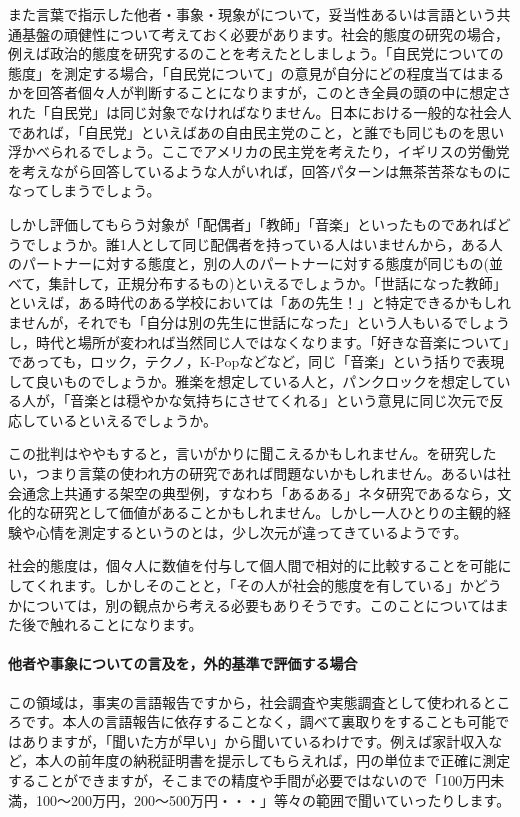 \documentclass{ltjsbook}
\begin{document}
また言葉で指示した他者・事象・現象がについて，妥当性あるいは言語という共通基盤の頑健性について考えておく必要があります。社会的態度の研究の場合，例えば政治的態度を研究するのことを考えたとしましょう。「自民党についての態度」を測定する場合，「自民党について」の意見が自分にどの程度当てはまるかを回答者個々人が判断することになりますが，このとき全員の頭の中に想定された「自民党」は同じ対象でなければなりません。日本における一般的な社会人であれば，「自民党」といえばあの自由民主党のこと，と誰でも同じものを思い浮かべられるでしょう。ここでアメリカの民主党を考えたり，イギリスの労働党を考えながら回答しているような人がいれば，回答パターンは無茶苦茶なものになってしまうでしょう。

しかし評価してもらう対象が「配偶者」「教師」「音楽」といったものであればどうでしょうか。誰1人として同じ配偶者を持っている人はいませんから，ある人のパートナーに対する態度と，別の人のパートナーに対する態度が同じもの(並べて，集計して，正規分布するもの)といえるでしょうか。「世話になった教師」といえば，ある時代のある学校においては「あの先生！」と特定できるかもしれませんが，それでも「自分は別の先生に世話になった」という人もいるでしょうし，時代と場所が変われば当然同じ人ではなくなります。「好きな音楽について」であっても，ロック，テクノ，K-Popなどなど，同じ「音楽」という括りで表現して良いものでしょうか。雅楽を想定している人と，パンクロックを想定している人が，「音楽とは穏やかな気持ちにさせてくれる」という意見に同じ次元で反応しているといえるでしょうか。

この批判はややもすると，言いがかりに聞こえるかもしれません。を研究したい，つまり言葉の使われ方の研究であれば問題ないかもしれません。あるいは社会通念上共通する架空の典型例，すなわち「あるある」ネタ研究であるなら，文化的な研究として価値があることかもしれません。しかし一人ひとりの主観的経験や心情を測定するというのとは，少し次元が違ってきているようです。

社会的態度は，個々人に数値を付与して個人間で相対的に比較することを可能にしてくれます。しかしそのことと，「その人が社会的態度を有している」かどうかについては，別の観点から考える必要もありそうです。このことについてはまた後で触れることになります。

\paragraph{他者や事象についての言及を，外的基準で評価する場合}
この領域は，事実の言語報告ですから，社会調査や実態調査として使われるところです。本人の言語報告に依存することなく，調べて裏取りをすることも可能ではありますが，「聞いた方が早い」から聞いているわけです。例えば家計収入など，本人の前年度の納税証明書を提示してもらえれば，円の単位まで正確に測定することができますが，そこまでの精度や手間が必要ではないので「100万円未満，100〜200万円，200〜500万円・・・」等々の範囲で聞いていったりします。
\end{document}

